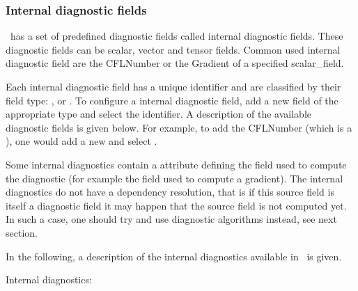 \subsubsection{Internal diagnostic fields}
\fluidity\ has a set of predefined diagnostic fields called internal diagnostic fields. These diagnostic fields can be scalar, vector and tensor fields. Common used internal diagnostic field are the CFLNumber or the Gradient of a specified scalar\_field.


Each internal diagnostic field has a unique identifier and are classified by their field type: , 
or . To configure a internal diagnostic field, add a new field of the appropriate type and select the identifier. A description of the available diagnostic fields is given below. For example, to add the CFLNumber (which is a ), one would add a new  and select . 

Some internal diagnostics contain a 
attribute defining the field used to compute the diagnostic (for example the
field used to compute a gradient). The internal diagnostics do not have a dependency resolution, that is if this source field is itself a diagnostic
field it may happen that the source field is not computed yet. In such a case, one should try and use diagnostic algorithms instead, see next section.

In the following, a description of the internal diagnostics available in \fluidity\ is given. 

Internal  diagnostics:

